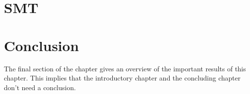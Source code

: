 \section{SMT}


\section{Conclusion}
The final section of the chapter gives an overview of the important results
of this chapter. This implies that the introductory chapter and the
concluding chapter don't need a conclusion.

